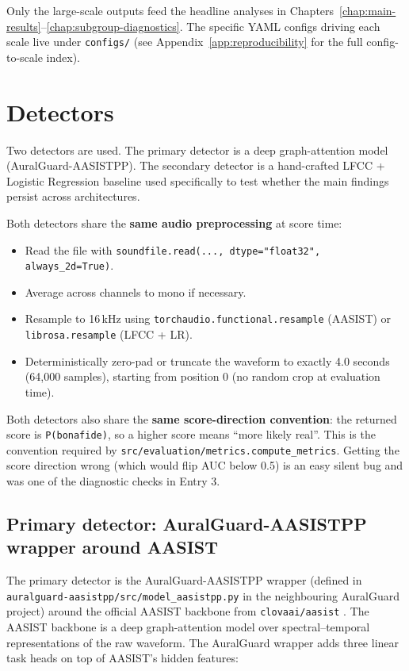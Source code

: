 Only the large-scale outputs feed the headline analyses in
Chapters~\ref{chap:main-results}--\ref{chap:subgroup-diagnostics}.
The specific YAML configs driving each scale live under
\texttt{configs/} (see Appendix~\ref{app:reproducibility} for the
full config-to-scale index).


\section{Detectors}
\label{sec:methodology-detectors}

Two detectors are used. The primary detector is a deep
graph-attention model (AuralGuard-AASISTPP). The secondary detector
is a hand-crafted LFCC + Logistic Regression baseline used
specifically to test whether the main findings persist across
architectures.

Both detectors share the \textbf{same audio preprocessing} at score time:

\begin{itemize}
    \item Read the file with \texttt{soundfile.read(..., dtype="float32", always\_2d=True)}.
    \item Average across channels to mono if necessary.
    \item Resample to 16\,kHz using \texttt{torchaudio.functional.resample} (AASIST)
        or \texttt{librosa.resample} (LFCC + LR).
    \item Deterministically zero-pad or truncate the waveform to exactly
        4.0 seconds (64,000 samples), starting from position 0 (no random
        crop at evaluation time).
\end{itemize}

Both detectors also share the \textbf{same score-direction
convention}: the returned score is \texttt{P(bonafide)}, so a higher
score means ``more likely real''. This is the convention required by
\texttt{src/evaluation/metrics.compute\_metrics}. Getting the score
direction wrong (which would flip AUC below 0.5) is an easy silent
bug and was one of the diagnostic checks in Entry 3.

\subsection{Primary detector: AuralGuard-AASISTPP wrapper around AASIST}
\label{sec:methodology-detectors-aasist}

The primary detector is the AuralGuard-AASISTPP wrapper (defined in
\texttt{auralguard-aasistpp/src/model\_aasistpp.py} in the neighbouring
AuralGuard project) around the official AASIST backbone from
\texttt{clovaai/aasist} \cite{Jung2022_AASIST}. The AASIST backbone
is a deep graph-attention model over spectral--temporal
representations of the raw waveform. The AuralGuard wrapper adds
three linear task heads on top of AASIST's hidden features:

